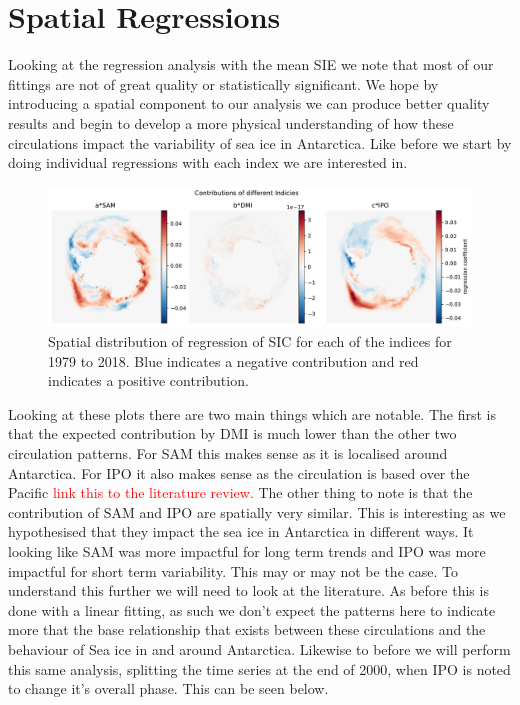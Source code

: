 \section{Spatial Regressions}
Looking at the regression analysis with the mean SIE we note that most of our fittings are not of great quality or statistically significant. We hope by introducing a spatial component to our analysis we can produce better quality results and begin to develop a more physical understanding of how these circulations impact the variability of sea ice in Antarctica.
Like before we start by doing individual regressions with each index we are interested in.
\begin{figure}[H]
    \centering
    \includegraphics[width=\linewidth]{Images_3.0/regressions/index_contribution_anomalous_n1_annually_1979_2018.pdf}
    \caption[Spatial distribution of regression of SIC for each of the indices for 1979 to 2018]{Spatial distribution of regression of SIC for each of the indices for 1979 to 2018. Blue indicates a negative contribution and red indicates a positive contribution.}
    \label{fig:index_contribution_anomalous_n1_annually_1979_2018}
\end{figure}
Looking at these plots there are two main things which are notable. The first is that the expected contribution by DMI is much lower than the other two circulation patterns. For SAM this makes sense as it is localised around Antarctica. For IPO it also makes sense as the circulation is based over the Pacific \textcolor{red}{link this to the literature review.} The other thing to note is that the contribution of SAM and IPO are spatially very similar. This is interesting as we hypothesised that they impact the sea ice in Antarctica in different ways. It looking like SAM was more impactful for long term trends and IPO was more impactful for short term variability. This may or may not be the case. To understand this further we will need to look at the literature. As before this is done with a linear fitting, as such we don't expect the patterns here to indicate more that the base relationship that exists between these circulations and the behaviour of Sea ice in and around Antarctica. Likewise to before we will perform this same analysis, splitting the time series at the end of 2000, when IPO is noted to change it's overall phase. This can be seen below.

